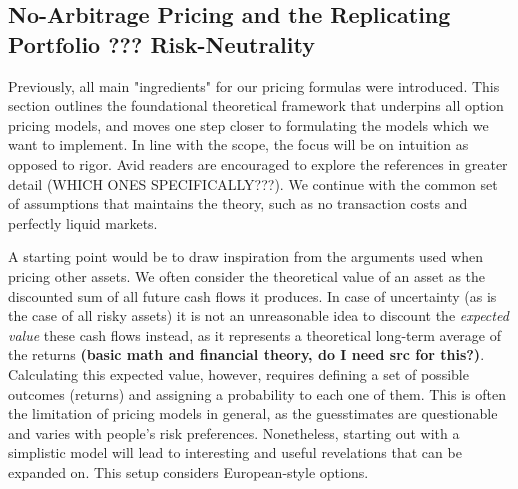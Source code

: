 \documentclass[english,12pt,a4paper,pdftex,sci,utf8]{aaltothesis}
\begin{document}
\subsection{No-Arbitrage Pricing and the Replicating Portfolio ??? Risk-Neutrality}
Previously, all main "ingredients" for our pricing formulas were introduced. This section outlines the foundational theoretical framework that underpins all option pricing models, and moves one step closer to formulating the models which we want to implement. In line with the scope, the focus will be on intuition as opposed to rigor. Avid readers are encouraged to explore the references in greater detail (WHICH ONES SPECIFICALLY???). We continue with the common set of assumptions that maintains the theory, such as no transaction costs and perfectly liquid markets.

A starting point would be to draw inspiration from the arguments used when pricing other assets. We often consider the theoretical value of an asset as the discounted sum of all future cash flows it produces. In case of uncertainty (as is the case of all risky assets) it is not an unreasonable idea to discount the \emph{expected value} these cash flows instead, as it represents a theoretical long-term average of the returns \textbf{(basic math and financial theory, do I need src for this?)}. Calculating this expected value, however, requires defining a set of possible outcomes (returns) and assigning a probability to each one of them. This is often the limitation of pricing models in general, as the guesstimates are questionable and varies with people's risk preferences. Nonetheless, starting out with a simplistic model will lead to interesting and useful revelations that can be expanded on. This setup considers European-style options.
\end{document}
